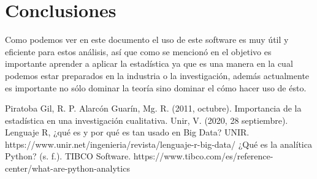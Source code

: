 \documentclass{report}
\begin{document}
\section{Conclusiones}
Como podemos ver en este documento el uso de este software es muy útil y eficiente para estos análisis, así que como se mencionó en el objetivo es importante aprender a aplicar la estadística ya que es una manera en la cual podemos estar preparados en la industria o la investigación, además actualmente es importante no sólo dominar la teoría sino dominar el cómo hacer uso de ésto. 

\begin{thebibliography}{8}

Piratoba Gil, R. P. Alarcón Guarín, Mg. R. (2011, octubre). Importancia de la estadística en una investigación cualitativa.
Unir, V. (2020, 28 septiembre). Lenguaje R, ¿qué es y por qué es tan usado en Big Data? UNIR. https://www.unir.net/ingenieria/revista/lenguaje-r-big-data/
¿Qué es la analítica Python? (s. f.). TIBCO Software. https://www.tibco.com/es/reference-center/what-are-python-analytics
\end{thebibliography}
\end{document}
